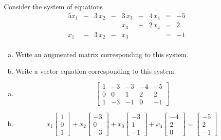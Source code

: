 
\begin{exerciseStatement}


 Consider the system of equations 
\begin{alignat*}{5} x_{1} &-& 3 \, x_{2} &-& 3 \, x_{3} &-& 4 \, x_{4} &=& -5 \\ & &  & & x_{3} &+& 2 \, x_{4} &=& 2 \\x_{1} &-& 3 \, x_{2} &-& x_{3} & &  &=& -1 \\ \end{alignat*}
            


\begin{enumerate}[(a)]
\item  Write an augmented matrix corresponding to this system. 
\item  Write a vector equation corresponding to this system. 
\end{enumerate}
    
\end{exerciseStatement}
    
\begin{exerciseAnswer} 

\begin{enumerate}[(a)]
\item \[ \left[\begin{array}{cccc|c}
1 & -3 & -3 & -4 & -5 \\
0 & 0 & 1 & 2 & 2 \\
1 & -3 & -1 & 0 & -1
\end{array}\right] \]
\item \[ x_{1} \left[\begin{array}{c}
1 \\
0 \\
1
\end{array}\right] + x_{2} \left[\begin{array}{c}
-3 \\
0 \\
-3
\end{array}\right] + x_{3} \left[\begin{array}{c}
-3 \\
1 \\
-1
\end{array}\right] + x_{4} \left[\begin{array}{c}
-4 \\
2 \\
0
\end{array}\right] = \left[\begin{array}{c}
-5 \\
2 \\
-1
\end{array}\right] \]
\end{enumerate}
    
\end{exerciseAnswer}
    
